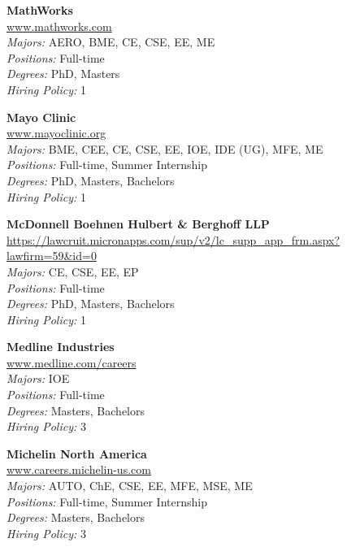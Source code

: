\documentclass[twoside]{article}
\begin{document}
\begin{center}
\begin{multicols}{3}
\begin{minipage}{.9\columnwidth}{\Large\bf MathWorks }\\
	\url{www.mathworks.com}\\
	\emph{Majors:} AERO, BME, CE, CSE, EE, ME\\
	\emph{Positions:} Full-time\\
	\emph{Degrees:} PhD, Masters\\
	\emph{Hiring Policy:} 1\\
\end{minipage}
 
\begin{minipage}{.9\columnwidth}{\Large\bf Mayo Clinic }\\
	\url{www.mayoclinic.org}\\
	\emph{Majors:} BME, CEE, CE, CSE, EE, IOE, IDE (UG), MFE, ME\\
	\emph{Positions:} Full-time, Summer Internship\\
	\emph{Degrees:} PhD, Masters, Bachelors\\
	\emph{Hiring Policy:} 1\\
\end{minipage}
 
\begin{minipage}{.9\columnwidth}{\Large\bf McDonnell Boehnen Hulbert \& Berghoff LLP }\\
	\url{https://lawcruit.micronapps.com/sup/v2/lc_supp_app_frm.aspx?lawfirm=59&id=0}\\
	\emph{Majors:} CE, CSE, EE, EP\\
	\emph{Positions:} Full-time\\
	\emph{Degrees:} PhD, Masters, Bachelors\\
	\emph{Hiring Policy:} 1\\
\end{minipage}
 
\begin{minipage}{.9\columnwidth}{\Large\bf Medline Industries }\\
	\url{www.medline.com/careers}\\
	\emph{Majors:} IOE\\
	\emph{Positions:} Full-time\\
	\emph{Degrees:} Masters, Bachelors\\
	\emph{Hiring Policy:} 3\\
\end{minipage}
 
\begin{minipage}{.9\columnwidth}{\Large\bf Michelin North America }\\
	\url{www.careers.michelin-us.com}\\
	\emph{Majors:} AUTO, ChE, CSE, EE, MFE, MSE, ME\\
	\emph{Positions:} Full-time, Summer Internship\\
	\emph{Degrees:} Masters, Bachelors\\
	\emph{Hiring Policy:} 3\\
\end{minipage}
 

\end{multicols}
\end{center}
\end{document}

